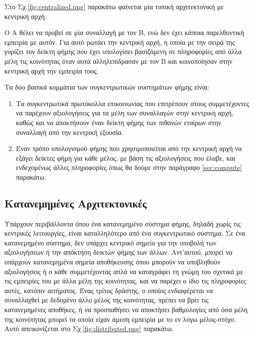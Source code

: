 Στο Σχ.\ref{fig:centralized.png} παρακάτω φαίνεται μία τυπική αρχιτεκτονική με κεντρική αρχή.



Ο Α θέλει να προβεί σε μία συναλλαγή με τον Β, ενώ δεν έχει κάποια παρελθοντική εμπειρία με αυτόν. Για αυτό ρωτάει την κεντρική αρχή, η οποία με την σειρά της γυρίζει τον δείκτη φήμης που έχει υπολογίσει βασιζόμενη σε πληροφορίες από άλλα μέλη τις κοινότητας όταν αυτά αλληλεπίδρασαν με τον Β και κοινοποίησαν στην κεντρική αρχή την εμπειρία τους.

Τα δύο βασικά κομμάτια των συγκεντρωτικών συστημάτων φήμης είναι:
\begin{enumerate}

\item Τα συγκεντρωτικά πρωτόκολλα επικοινωνίας που επιτρέπουν στους συμμετέχοντες να παρέχουν αξιολογήσεις για τα μέλη των συναλλαγών στην κεντρική αρχή, καθώς και να αποκτήσουν έναν δείκτη φήμης των πιθανών εταίρων στην συναλλαγή από την κεντρική εξουσία.

\item Έναν τρόπο υπολογισμού φήμης που χρησιμοποιείται από την κεντρική αρχή να εξάγει δείκτες φήμη για κάθε μέλος, με βάση τις αξιολογήσεις που έλαβε, και ενδεχομένως άλλες πληροφορίες όπως θα δούμε στην παράγραφο \ref{sec:compute} παρακάτω.

\end{enumerate}
\newpage
\subsection{Κατανεμημένες Αρχιτεκτονικές}\label{sec:decentralized}

Υπάρχουν περιβάλλοντα όπου ένα κατανεμημένο σύστημα φήμης, δηλαδή χωρίς τις κεντρικές λειτουργίες, είναι καταλληλότερο από ένα συγκεντρωτικό σύστημα. Σε ένα κατανεμημένο σύστημα, δεν υπάρχει κεντρικό σημείο για την υποβολή των αξιολογήσεων ή την απόκτηση δεικτών φήμης των άλλων. Αντ'αυτού, μπορεί να υπάρχουν κατανεμημένα σημεία αποθήκευσης όπου μπορούν να υποβληθούν αξιολογήσεις ή ο κάθε συμμετέχοντας απλά να καταγράφει τη γνώμη του σχετικά με τις εμπειρίες του με άλλα μέλη της κοινότητας, και να παρέχει ο ίδιο τις πληροφορίες αυτές, κατόπιν αιτήματος. Ένας τρίτος δράστης, ο οποίος ενδιαφέρεται να συναλλαχθεί με δεδομένο άλλο μέλος της κοινότητας, πρέπει να βρει τις κατανεμημένες αποθήκες, ή να προσπαθήσει να αποκτήσει βαθμολογίες από όσα μέλη της κοινότητας μπορεί τα οποία είχαν άμεση εμπειρία με το εν λόγω μέλος-στόχο. Αυτό απεικονίζεται στο Σχ.\ref{fig:distributed.png}  παρακάτω.

